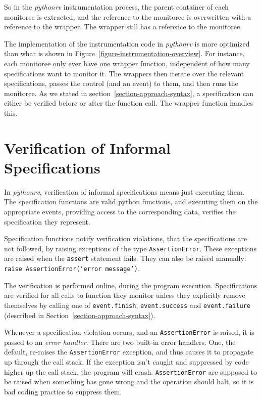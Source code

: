 \documentclass[a4paper,11pt]{kth-mag}
\theoremstyle{definition}
\begin{document}

So in the \textit{pythonrv} instrumentation process, the parent container of
each monitoree is extracted, and the reference to the monitoree is overwritten
with a reference to the wrapper. The wrapper still has a reference to the
monitoree.

The implementation of the instrumentation code in \textit{pythonrv} is more
optimized than what is shown in Figure~\ref{figure-instrumentation-overview}.
For instance, each monitoree only ever have one wrapper function, independent
of how many specifications want to monitor it. The wrappers then iterate over
the relevant specifications, passes the control (and an event) to them, and
then runs the monitoree. As we stated in section~\ref{section-approach-syntax},
a specification can either be verified before or after the function call. The
wrapper function handles this.



\section{Verification of Informal Specifications}
\label{section-approach-verification}

In \textit{pythonrv}, verification of informal specifications means just
executing them. The specification functions are valid python functions, and
executing them on the appropriate events, providing access to the corresponding
data, verifies the specification they represent.

Specification functions notify verification violations, that the specifications
are not followed, by raising exceptions of the type \texttt{AssertionError}.
These exceptions are raised when the \texttt{assert} statement fails. They can
also be raised manually: \texttt{raise AssertionError('error message')}.

The verification is performed online, during the program execution.
Specifications are verified for all calls to function they monitor unless they
explicitly remove themselves by calling one of \texttt{event.finish},
\texttt{event.success} and \texttt{event.failure} (described in
Section~\ref{section-approach-syntax}).

Whenever a specification violation occurs, and an \texttt{AssertionError} is
raised, it is passed to an \textit{error handler}. There are two built-in error
handlers. One, the default, re-raises the \texttt{AssertionError} exception,
and thus causes it to propagate up through the call stack. If the exception
isn't caught and suppressed by code higher up the call stack, the program will
crash. \texttt{AssertionError} are supposed to be raised when something has
gone wrong and the operation should halt, so it is bad coding practice to
suppress them.
\end{document}
